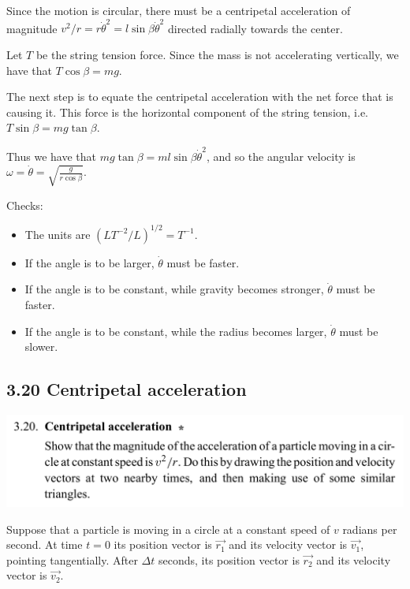 Since the motion is circular, there must be a centripetal acceleration of magnitude
$v^2/r = r\dot{\theta}^2 = l\sin\beta\dot{\theta}^2$ directed radially towards the center.

Let $T$ be the string tension force. Since the mass is not accelerating vertically, we have that
$T\cos\beta = mg$.

The next step is to equate the centripetal acceleration with the net force that is causing it. This
force is the horizontal component of the string tension, i.e. $T\sin\beta = mg\tan\beta$.

Thus we have that $mg\tan\beta = ml\sin\beta\dot{\theta}^2$, and so the angular velocity is
$\omega = \dot{\theta} = \sqrt{\frac{g}{r\cos\beta}}$.

Checks:
\begin{itemize}
\item The units are $(LT^{-2}/L)^{1/2} = T^{-1}$. \checkmark
\item If the angle is to be larger, $\dot{\theta}$ must be faster. \checkmark
\item If the angle is to be constant, while gravity becomes stronger, $\dot{\theta}$ must be
  faster. \checkmark
\item If the angle is to be constant, while the radius becomes larger, $\dot{\theta}$ must be
  slower. \checkmark
\end{itemize}


\subsection*{3.20 Centripetal acceleration}
\begin{mdframed}
  \includegraphics[width=400pt]{img/physics--classical-mechanics--morin--3-20.png}
\end{mdframed}

Suppose that a particle is moving in a circle at a constant speed of $v$ radians per second. At time
$t = 0$ its position vector is $\vec{r_1}$ and its velocity vector is $\vec{v_1}$, pointing
tangentially.  After $\Delta t$ seconds, its position vector is $\vec{r_2}$ and its velocity vector
is $\vec{v_2}$.

